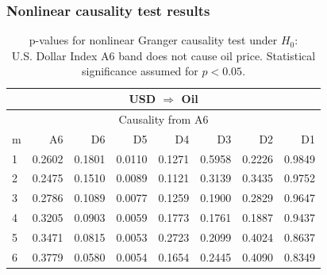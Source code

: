 \subsubsection{Nonlinear causality test results}

%
%
\begin{table}[H]
\begin{center}
\begin{tabular}{l|r r r r r r r}
\hline\hline
\multicolumn{8}{c}{USD $\Rightarrow$ Oil}\\
\hline
\multicolumn{8}{c}{Causality from A6}\\
\hline\hline
m & A6 & D6 & D5 & D4 & D3 & D2 & D1 \\
\hline
1 & 0.2602 & 0.1801 & \cellcolor{mygrey}0.0110 & 0.1271 & 0.5958 & 0.2226 & 0.9849 \\
2 & 0.2475 & 0.1510 & \cellcolor{mygrey}0.0089 & 0.1121 & 0.3139 & 0.3435 & 0.9752 \\
3 & 0.2786 & 0.1089 & \cellcolor{mygrey}0.0077 & 0.1259 & 0.1900 & 0.2829 & 0.9647 \\
4 & 0.3205 & 0.0903 & \cellcolor{mygrey}0.0059 & 0.1773 & 0.1761 & 0.1887 & 0.9437 \\
5 & 0.3471 & 0.0815 & 0.0053 & 0.2723 & 0.2099 & 0.4024 & 0.8637 \\
6 & 0.3779 & 0.0580 & 0.0054 & 0.1654 & 0.2445 & 0.4090 & 0.8349 \\
\hline\hline
\end{tabular}
\caption{p-values for nonlinear Granger causality test under $H_0$:\\
U.S. Dollar Index A6 band does not cause oil price. Statistical significance assumed for $p<0.05$.}
\end{center}
\end{table}

